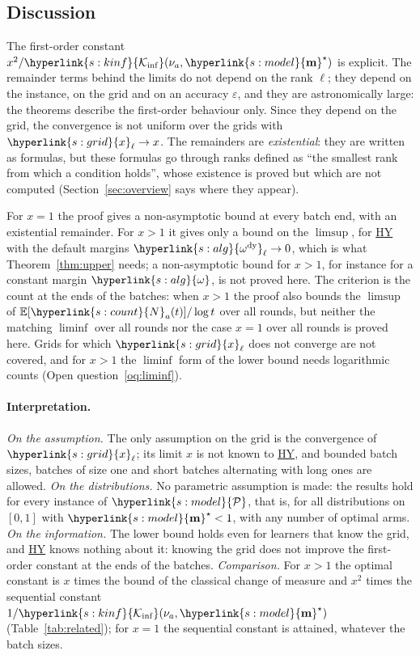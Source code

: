\documentclass[10pt]{article}
\newcommand{\sy}[2]{{\hyperlink{#1}{#2}}}
\newcommand{\E}{\mathbb{E}}
\newcommand{\1}{\mathbf{1}}
\newcommand{\m}{\sy{s:model}{\mathbf{m}}}
\newcommand{\cP}{\sy{s:model}{\mathcal P}}
\newcommand{\Ki}{\sy{s:kinf}{\mathcal K_{\inf}}}
\newcommand{\Ng}{\sy{s:count}{N}}
\newcommand{\xg}{\sy{s:grid}{x}}
\newcommand{\HY}{\hyperref[def:hy]{\textup{HY}}}
\newcommand{\om}{\sy{s:alg}{\omega}}
\newcommand{\ody}{\sy{s:alg}{\omega^{\mathrm{dy}}}}
\begin{document}
\subsection{Discussion}\label{sec:discussion}

\begin{remark}[constants]
The first-order constant $x^2/\Ki(\nu_a,\m^\star)$ is explicit. The remainder terms behind the limits do not depend on the rank $\ell$; they depend on the instance, on the
grid and on an accuracy $\varepsilon$, and they are astronomically large: the theorems describe the first-order behaviour only. Since they depend on the grid, the
convergence is not uniform over the grids with $\xg_\ell\to x$. The remainders are \emph{existential}: they are written as formulas, but these formulas go through ranks
defined as ``the smallest rank from which a condition holds'', whose existence is proved but which are not computed (Section~\ref{sec:overview} says where they appear).
\end{remark}

\begin{remark}
For $x=1$ the proof gives a non-asymptotic bound at every batch end, with an existential remainder. For $x>1$ it gives only a bound on the $\limsup$, for \HY{} with the
default margins $\ody_\ell\to0$, which is what Theorem~\ref{thm:upper} needs; a non-asymptotic bound for $x>1$, for instance for a constant margin $\om$, is not proved here.
The criterion is the count at the ends of the batches: when $x>1$ the proof also bounds the $\limsup$ of $\E[\Ng_a(t)]/\log t$ over all rounds, but neither the matching
$\liminf$ over all rounds nor the case $x=1$ over all rounds is proved here. Grids for which $\xg_\ell$ does not converge are not covered, and for $x>1$ the $\liminf$ form
of the lower bound needs logarithmic counts (Open question~\ref{oq:liminf}).
\end{remark}

\paragraph{Interpretation.} \emph{On the assumption.} The only assumption on the grid is the convergence of $\xg_\ell$; its limit $x$ is not known to \HY, and bounded batch
sizes, batches of size one and short batches alternating with long ones are allowed. \emph{On the distributions.} No parametric assumption is made: the results hold for every
instance of $\cP$, that is, for all distributions on $[0,1]$ with $\m^\star<1$, with any number of optimal arms. \emph{On the information.} The lower bound holds even for learners that know the grid, and \HY{}
knows nothing about it: knowing the grid does not improve the first-order constant at the ends of the batches. \emph{Comparison.} For $x>1$ the optimal constant is $x$ times
the bound of the classical change of measure and $x^2$ times the sequential constant $1/\Ki(\nu_a,\m^\star)$ (Table~\ref{tab:related}); for $x=1$ the sequential constant
is attained, whatever the batch sizes.
\end{document}
